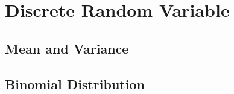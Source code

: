 \documentclass[../main]{subfiles}
\begin{document}
\section{Discrete Random Variable}

\subsection{Mean and Variance}

\subsection{Binomial Distribution}
\end{document}

